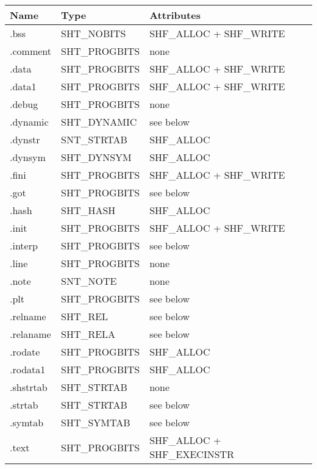 \documentclass[a4paper,left=2.5cm,right=2.5cm,11pt]{article}
\begin{document}
	\begin{longtable}{p{2cm}|p{3cm}|p{7cm}}
	\hline
	Name & Type & Attributes \\
	\hline
	.bss & SHT\_NOBITS & SHF\_ALLOC + SHF\_WRITE \\
	.comment & SHT\_PROGBITS & none \\
	.data & SHT\_PROGBITS & SHF\_ALLOC + SHF\_WRITE\\
	.data1 & SHT\_PROGBITS & SHF\_ALLOC + SHF\_WRITE\\
	.debug & SHT\_PROGBITS & none\\
	.dynamic & SHT\_DYNAMIC & see below\\
	.dynstr & SNT\_STRTAB & SHF\_ALLOC\\
	.dynsym & SHT\_DYNSYM & SHF\_ALLOC\\
	.fini & SHT\_PROGBITS & SHF\_ALLOC + SHF\_WRITE\\
	.got & SHT\_PROGBITS & see below\\
	.hash & SHT\_HASH & SHF\_ALLOC \\
	.init & SHT\_PROGBITS & SHF\_ALLOC + SHF\_WRITE\\
	.interp & SHT\_PROGBITS & see below\\
	.line & SHT\_PROGBITS & none\\
	.note & SNT\_NOTE & none\\
	.plt & SHT\_PROGBITS & see below\\
	.relname & SHT\_REL & see below\\
	.relaname & SHT\_RELA & see below\\
	.rodate & SHT\_PROGBITS & SHF\_ALLOC\\
	.rodata1 & SHT\_PROGBITS & SHF\_ALLOC\\
	.shstrtab & SHT\_STRTAB & none\\
	.strtab & SHT\_STRTAB & see below\\
	.symtab & SHT\_SYMTAB & see below \\
	.text & SHT\_PROGBITS & SHF\_ALLOC + SHF\_EXECINSTR \\
	\hline
	\end{longtable}

	\vspace{0.5em}
\end{document}
